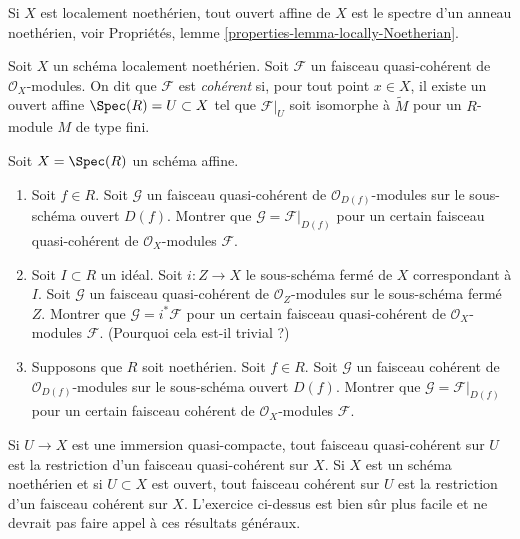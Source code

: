 \noindent
Si $X$ est localement noethérien, tout ouvert affine de $X$
est le spectre d'un anneau noethérien, voir
Propriétés, lemme \ref{properties-lemma-locally-Noetherian}.

\begin{definition}
\label{definition-coherent}
Soit $X$ un schéma localement noethérien.
Soit $\mathcal{F}$ un faisceau quasi-cohérent de
$\mathcal{O}_X$-modules. On dit que $\mathcal{F}$ est {\it cohérent}
si, pour tout point $x \in X$, il existe un ouvert affine
$\Spec(R) = U \subset X$ tel que $\mathcal{F}|_U$
soit isomorphe à $\widetilde M$ pour un $R$-module $M$ de type fini.
\end{definition}

\begin{exercise}
\label{exercise-extend-quasi-coherent}
Soit $X = \Spec(R)$ un schéma affine.
\begin{enumerate}
\item Soit $f \in R$. Soit $\mathcal{G}$ un
faisceau quasi-cohérent de $\mathcal{O}_{D(f)}$-modules
sur le sous-schéma ouvert $D(f)$.
Montrer que $\mathcal{G} = \mathcal{F}|_{D(f)}$ pour un certain
faisceau quasi-cohérent de $\mathcal{O}_X$-modules
$\mathcal{F}$.
\item Soit $I \subset R$ un idéal.
Soit $i : Z \to X$ le sous-schéma fermé de $X$ correspondant
à $I$. Soit $\mathcal{G}$ un
faisceau quasi-cohérent de $\mathcal{O}_Z$-modules
sur le sous-schéma fermé $Z$.
Montrer que $\mathcal{G} = i^*\mathcal{F}$ pour un certain
faisceau quasi-cohérent de $\mathcal{O}_X$-modules $\mathcal{F}$.
(Pourquoi cela est-il trivial ?)
\item Supposons que $R$ soit noethérien.
Soit $f \in R$. Soit $\mathcal{G}$ un
faisceau cohérent de $\mathcal{O}_{D(f)}$-modules
sur le sous-schéma ouvert $D(f)$.
Montrer que $\mathcal{G} = \mathcal{F}|_{D(f)}$ pour un certain
faisceau cohérent de $\mathcal{O}_X$-modules $\mathcal{F}$.
\end{enumerate}
\end{exercise}

\begin{remark}
\label{remark-extend-off-open}
Si $U \to X$ est une immersion quasi-compacte, tout
faisceau quasi-cohérent sur $U$ est la restriction d'un
faisceau quasi-cohérent sur $X$.
Si $X$ est un schéma noethérien et si $U \subset X$ est ouvert,
tout faisceau cohérent sur $U$ est la restriction d'un
faisceau cohérent sur $X$.
L'exercice ci-dessus est bien sûr plus facile et ne devrait pas faire appel à ces résultats généraux.
\end{remark}
















